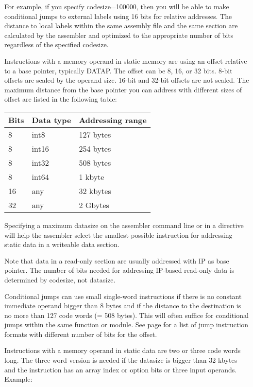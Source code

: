\documentclass[forwardcom.tex]{subfiles}
\begin{document}
For example, if you specify codesize=100000, then you will be able to make conditional jumps to external labels using 16 bits for relative addresses. 
The distance to local labels within the same assembly file and the same section are calculated by the assembler and optimized to the appropriate number of bits regardless of the specified codesize.
\vv

Instructions with a memory operand in static memory are using an offset relative to a base pointer, typically DATAP. The offset can be 8, 16, or 32 bits. 8-bit offsets are scaled by the operand size. 16-bit and 32-bit offsets are not scaled. The maximum distance from the base pointer you can address with different sizes of offset are listed in the following table:
\vv

\begin{tabular}{|p{20mm}|p{20mm}|p{116mm}|}
\hline
\bfseries Bits & \bfseries Data type & \bfseries Addressing range \\
\hline
8 & int8 & 127 bytes \\
8 & int16 & 254 bytes \\
8 & int32 & 508 bytes \\
8 & int64 & 1 kbyte \\
16 & any & 32 kbytes \\
32 & any & 2 Gbytes \\
\hline
\end{tabular}
\vv

Specifying a maximum datasize on the assembler command line or in a directive will help the assembler select the smallest possible instruction for addressing static data in a writeable data section. 
\vv

Note that data in a read-only section are usually addressed with IP as base pointer. The number of bits needed for addressing IP-based read-only data is determined by codesize, not datasize.
\vv

Conditional jumps can use small single-word instructions if there is no constant immediate operand bigger than 8 bytes and if the distance to the destination is no more than 127 code words (= 508 bytes). This will often suffice for conditional jumps within the same function or module. 
See page \pageref{table:jumpInstructionFormats} for a list of jump instruction formats with different number of bits for the offset.
\vv

Instructions with a memory operand in static data are two or three code words long. The three-word version is needed if the datasize is bigger than 32 kbytes and the instruction has an array index or option bits or three input operands. Example:
\end{document}

